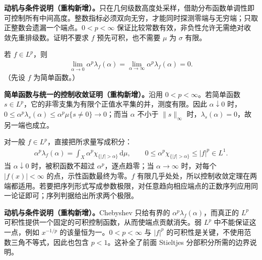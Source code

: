 \documentclass[../../main.tex]{subfiles}
\begin{document}
\begin{remark}
\textbf{动机与条件说明（重构新增）。}只在几何级数高度处采样，借助分布函数单调性即可控制所有中间高度。整数指标必须双向无穷，才能同时探测零端与无穷端；只取正整数会遗漏一个端点。$0<p<\infty$ 保证比较常数有效，非负性允许无需绝对收敛先重排级数。证明不要求 $f$ 预先可积，也不需要 $\mu$ 为 $\sigma$ 有限。
\end{remark}
\begin{exercise}\label{exercise:ch06-distribution-end-limits}
若 $f\in L^p$，则
\begin{align*}
\lim_{\alpha\to0}\alpha^p\lambda_f(\alpha)
=\lim_{\alpha\to\infty}\alpha^p\lambda_f(\alpha)=0.
\end{align*}
（先设 $f$ 为简单函数。）
\end{exercise}
\begin{solution}
\textbf{简单函数与统一的控制收敛证明（重构新增）。}沿用 $0<p<\infty$。若简单函数 $s\in L^p$，它的非零支集为有限个正值水平集的并，测度有限。因此 $\alpha\downarrow0$ 时，$0\leqslant\alpha^p\lambda_s(\alpha)\leqslant\alpha^p\mu\{s\ne0\}\to0$；而当 $\alpha$ 不小于 $\|s\|_\infty$ 时，$\lambda_s(\alpha)=0$，故另一端也成立。

对一般 $f\in L^p$，直接把所求量写成积分：
\begin{align*}
\alpha^p\lambda_f(\alpha)=\int_X\alpha^p\chi_{\{|f|>\alpha\}}\,\mathrm d\mu,
\qquad 0\leqslant\alpha^p\chi_{\{|f|>\alpha\}}\leqslant|f|^p\in L^1.
\end{align*}
当 $\alpha\downarrow0$ 时，被积函数不超过 $\alpha^p$，逐点趋零；当 $\alpha\to\infty$ 时，对每个 $|f(x)|<\infty$ 的点，示性函数最终为零。$f$ 有限几乎处处，所以控制收敛定理在两端都适用。若要把序列形式写成参数极限，对任意趋向相应端点的正数序列应用同一论证即可；序列判据给出所求两个极限。
\end{solution}
\begin{remark}
\textbf{动机与条件说明（重构新增）。}Chebyshev 只给有界的 $\alpha^p\lambda_f(\alpha)$，而真正的 $L^p$ 可积性提供一个固定的可积控制函数，从而使端点贡献消失。弱 $L^p$ 中不能保证这一点，例如 $x^{-1/p}$ 的该量恒为一。$0<p<\infty$ 与 $|f|^p$ 的可积性是关键，不使用范数三角不等式，因此也包含 $p<1$。这补全了前面 Stieltjes 分部积分所需的边界说明。
\end{remark}
\end{document}
